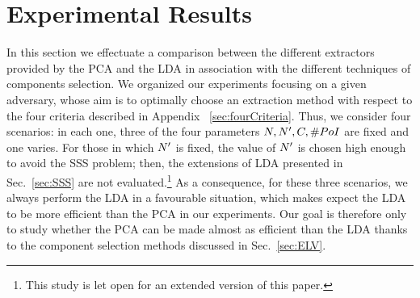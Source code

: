\section{Experimental Results}\label{sec:experiments}

In this section we effectuate a comparison between the different extractors provided by the PCA and the LDA in association with the different techniques  of components selection. We organized our experiments focusing on a given adversary, whose aim is to optimally choose an extraction method with respect to the four criteria described in Appendix ~\ref{sec:fourCriteria}. Thus, we consider four scenarios: in each one, three of the four parameters $\numTraces[], \numTraces[]', \newTraceLength, \numPoI$ are fixed and one varies. For those in which $\numTraces[]'$ is fixed, the value of $\numTraces[]'$ is chosen high enough to avoid the SSS problem; then, the extensions of LDA presented in Sec.~\ref{sec:SSS} are not evaluated.\footnote{This study is let open for an extended version of this paper.} As a consequence, for these three scenarios, we always perform the LDA in a favourable situation, which makes expect the LDA to be more efficient than the PCA in our experiments. Our goal is therefore only to study whether the PCA can be made almost as efficient than the LDA thanks to the component selection methods discussed in Sec.~\ref{sec:ELV}. 




